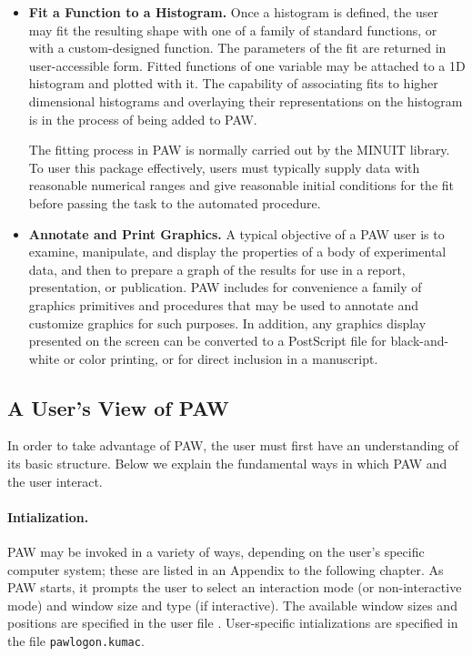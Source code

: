 \begin{itemize}
\item {\bf Fit a Function to a Histogram.}  Once a
histogram is defined, the user may fit the resulting shape with one of
a family of standard functions, or with a custom-designed function.
The parameters of the fit are returned in user-accessible form.
Fitted functions of one variable may be attached to a 1D histogram and
plotted with it.  The capability of associating fits to higher
dimensional histograms and overlaying their representations on the
histogram is in the process of being added to PAW.
 
The fitting process in PAW is normally carried out by the MINUIT
library.  To user this package effectively, users must typically
supply data with reasonable numerical ranges and give reasonable
initial conditions for the fit before passing the task to the
automated procedure.
 
\item {\bf Annotate and Print  Graphics.}
A typical objective of a PAW user is to examine, manipulate, and
display the properties of a body of experimental data, and then to
prepare a graph of the results for use in a report, presentation, or
publication.  PAW includes for convenience a family of graphics
primitives and procedures that may be used to annotate and customize
graphics for such purposes.  In addition, any graphics display
presented on the screen can be converted to a PostScript file for
black-and-white or color printing, or for direct inclusion in a
manuscript.
 
\end{itemize}
 
\subsection{A User's View of PAW}
 
In order to take advantage of PAW, the user must first have
an understanding of its basic structure.  Below we explain
the fundamental ways in which PAW and the user interact.
 
\paragraph{Intialization.}  PAW may be invoked in a variety
of ways, depending on the user's specific computer system;
these are listed in an Appendix to the following chapter.
As PAW starts, it prompts the user to select an interaction
mode (or non-interactive mode) and window size and type
(if interactive).  The available window sizes and positions
are specified in the user file .
User-specific intializations are specified in the file
{\tt pawlogon.kumac}.
 
